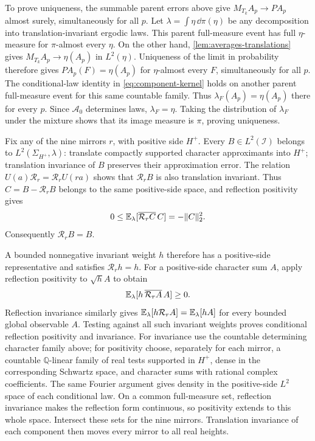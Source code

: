 To prove uniqueness, the summable parent errors above give
$M_{T_k}A_p\to PA_p$ almost surely, simultaneously for all $p$.
Let $\lambda=\int\eta\,\dd\pi(\eta)$ be any decomposition into
translation-invariant ergodic laws. This parent full-measure event
has full $\eta$-measure for $\pi$-almost every $\eta$.
On the other hand, \cref{lem:averages-translations} gives
$M_{T_k}A_p\to\eta(A_p)$ in $L^2(\eta)$.
Uniqueness of the limit in probability therefore gives
$PA_p(F)=\eta(A_p)$ for $\eta$-almost every $F$, simultaneously
for all $p$. The conditional-law identity in
\eqref{eq:component-kernel} holds on another parent full-measure
event for this same countable family. Thus
$\lambda_F(A_p)=\eta(A_p)$ there for every $p$.
Since $\mathcal A_0$ determines laws, $\lambda_F=\eta$.
Taking the distribution of $\lambda_F$ under the mixture shows
that its image measure is $\pi$, proving uniqueness.

Fix any of the nine mirrors $r$, with positive side $H^+$.
Every $B\in L^2(\mathcal I)$ belongs to $L^2(\Sigma_{H^+},\lambda)$:
translate compactly supported character approximants into $H^+$;
translation invariance of $B$ preserves their approximation error.
The relation $U(a)\mathcal R_r=\mathcal R_rU(ra)$ shows that
$\mathcal R_rB$ is also translation invariant. Thus
$C=B-\mathcal R_rB$ belongs to the same positive-side space, and
reflection positivity gives
\[
 0\le\mathbb E_\lambda[\overline{\mathcal R_rC}\,C]=-\|C\|_2^2.
\]
Consequently $\mathcal R_rB=B$.

A bounded nonnegative invariant weight $h$ therefore has a
positive-side representative and satisfies $\mathcal R_rh=h$.
For a positive-side character sum $A$, apply reflection positivity
to $\sqrt hA$ to obtain
\begin{equation}\label{eq:weighted-component-rp}
 \mathbb E_\lambda[h\,\overline{\mathcal R_rA}\,A]\ge0.
\end{equation}
Reflection invariance similarly gives
$\mathbb E_\lambda[h\mathcal R_rA]=\mathbb E_\lambda[hA]$
for every bounded global observable $A$.
Testing against all such invariant weights proves conditional
reflection positivity and invariance. For invariance use the
countable determining character family above; for positivity choose,
separately for each mirror, a countable $\mathbb Q$-linear family of
real tests supported in $H^+$, dense in the corresponding Schwartz
space, and character sums with rational complex coefficients. The same Fourier
argument gives density in the positive-side $L^2$ space of each
conditional law. On a common full-measure set, reflection invariance
makes the reflection form continuous, so positivity extends to this
whole space. Intersect these sets for the nine mirrors. Translation
invariance of each component then moves every mirror to all real
heights.


